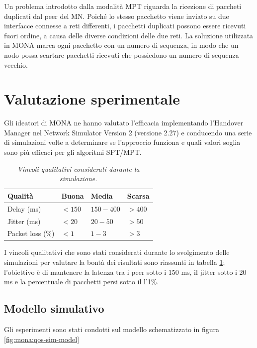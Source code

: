 \documentclass[12pt,a4paper,openright,twoside]{book}
\begin{document}
Un problema introdotto dalla modalità MPT riguarda la ricezione di
paccheti duplicati dal peer del MN. Poiché lo stesso pacchetto viene
inviato su due interfacce connesse a reti differenti, i pacchetti
duplicati possono essere ricevuti fuori ordine, a causa delle diverse
condizioni delle due reti. La soluzione utilizzata in MONA marca ogni
pacchetto con un numero di sequenza, in modo che un nodo possa
scartare pacchetti ricevuti che possiedono un numero di sequenza
vecchio.

\section{Valutazione sperimentale}

Gli ideatori di MONA ne hanno valutato l'efficacia implementando
l'Handover Manager nel Network Simulator Version 2 \cite{bib:ns-2}
(versione 2.27) e conducendo una serie di simulazioni volte a
determinare se l'approccio funziona e quali valori soglia sono più
efficaci per gli algoritmi SPT/MPT.

\begin{table}
  \centering
  \begin{tabular}[bt]{|llll|}
    \hline
    Qualità & Buona & Media & Scarsa         \\
    \hline
    Delay (ms) & $<150$ & $150-400$ & $>400$ \\
    Jitter (ms) & $<20$ & $20-50$ & $>50$    \\
    Packet loss (\%) & $<1$ & $1-3$ & $>3$   \\
    \hline
  \end{tabular}
  \caption{\em Vincoli qualitativi considerati durante la simulazione.}
  \label{tab:mona:vincoli}
\end{table}

I vincoli qualitativi che sono stati considerati durante lo
svolgimento delle simulazioni per valutare la bontà dei risultati sono
riassunti in tabella \ref{tab:mona:vincoli}; l'obiettivo è di
mantenere la latenza tra i peer sotto i 150 ms, il jitter sotto i 20
ms e la percentuale di pacchetti persi sotto il l'1\%.

\subsection{Modello simulativo}

Gli esperimenti sono stati condotti sul modello schematizzato in
figura \ref{fig:mona:qos-sim-model}
\end{document}
